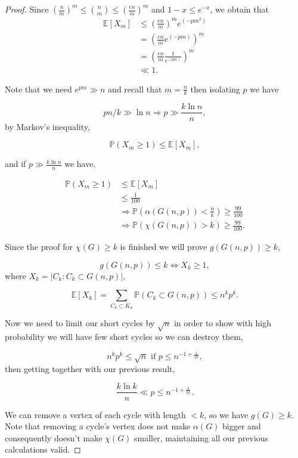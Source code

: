 \documentclass[12pt,twoside,a4paper,bibliography=totocnumbered]{book}
\numberwithin{equation}{section}
\let\log=\ln
\theoremstyle{remark}
\begin{document}
\begin{proof}
Since  $\left(\frac{n}{m}\right)^m \leq \binom{n}{m} \leq \left(\frac{en}{m}\right)^m$ and $1-x \leq e^{-x}$, we obtain that
\begin{align*}
\mathbb{E}[X_m] &\leq \left(\frac{en}{m}\right)^m  e^{(-pm^2)} \\
&= \left(\frac{en}{m} e^{(-pm)}\right)^m\\
&= \left(\frac{en}{m}\frac{1}{e^{(pm)}}\right)^m  \\
&\ll 1.
\end{align*}

Note that we need $e^{pm} \gg n$ and recall that $m =\frac{n}{k}$ then isolating $p$ we have

$$ pn/k \gg \log n \Rightarrow p \gg \frac{k\log n}{n},$$
by Markov's inequality,
 
 $$ \mathbb{P}(X_m \geq 1) \leq \mathbb{E}[X_m] ,$$
 
and if $p \gg \frac{k \log n}{n}$ we have,
 
 \begin{align*}
\mathbb{P}(X_m \geq 1) &\leq \mathbb{E}[X_m] \\
&\leq \frac{1}{100}  \\
&\Rightarrow \mathbb{P}\left(\alpha (G(n,p)) < \frac{n}{k}\right) \geq \frac{99}{100}\\ 
&\Rightarrow  \mathbb{P}\left(\chi(G(n,p)) > k \right) \geq \frac{99}{100}.
\end{align*}

Since the proof for $\chi(G) \geq k$ is finished we will prove $g(G(n,p))\geq k$,

$$ g(G(n,p)) \leq k \iff X_k \geq 1,$$
where $X_k = |C_k \colon C_k \subset G(n,p)|$,

$$\mathbb{E}[X_k] = \sum_{C_k \subset K_n} \mathbb{P}(C_k \subset G(n,p) ) \leq n^kp^k.$$

Now we need to limit our short cycles by $\sqrt{n}$ in order to show with high probability we will have few short cycles so we can destroy them,

$$n^kp^k \leq \sqrt{n} \text{ if } p \leq n^{-1 + \frac{1}{2k}},$$
then getting together with our previous result,

$$\frac{k\log k}{n} \ll p \leq n^{-1 + \frac{1}{2k}}.$$

We can remove a vertex of each cycle with length $<k$, so we have $g(G) \geq k$. Note that removing a cycle's vertex does not make $\alpha(G)$ bigger and consequently doesn't make $\chi(G)$ smaller, maintaining all our previous calculations valid.
\end{proof}
\end{document}
